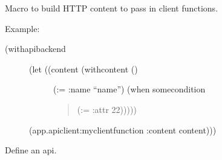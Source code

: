 \documentclass[letterpaper,10pt,english]{sphinxmanual}
\begin{document}
\begin{fulllineitems}
\label{\detokenize{symbols:macro:rest-server:with-content}}
Macro to build HTTP content to pass in client functions.

Example:
\begin{description}
\item[{(with\sphinxhyphen{}api\sphinxhyphen{}backend }] \leavevmode\begin{description}
\item[{(let ((content (with\sphinxhyphen{}content ()}] \leavevmode
(:= :name “name”)
(when some\sphinxhyphen{}condition
\begin{quote}

(:= :attr 22)))))
\end{quote}

\end{description}

(app.api\sphinxhyphen{}client:my\sphinxhyphen{}client\sphinxhyphen{}function :content content)))

\end{description}

\end{fulllineitems}


\begin{fulllineitems}
\label{\detokenize{symbols:macro:rest-server:with-pagination}}
\end{fulllineitems}


\begin{fulllineitems}
\label{\detokenize{symbols:macro:rest-server:define-api}}
Define an api.

\end{fulllineitems}
\end{document}
